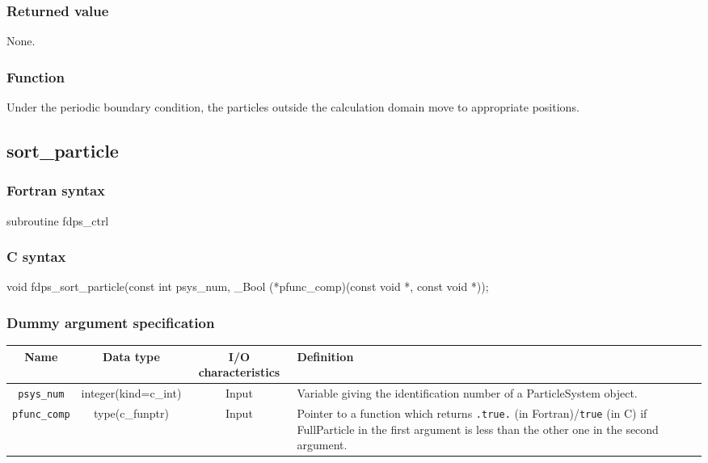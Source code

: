 \subsubsection*{Returned value}
None.

\subsubsection*{Function}
Under the periodic boundary condition, the particles outside the calculation domain move to appropriate positions.

\clearpage

\subsection{sort\_particle}
\subsubsection*{Fortran syntax}
\begin{screen}
\begin{spverbatim}
subroutine fdps_ctrl%
\end{spverbatim}
\end{screen}

\subsubsection*{C syntax}
\begin{screen}
\begin{spverbatim}
void fdps_sort_particle(const int psys_num,
                        _Bool (*pfunc_comp)(const void *, const void *));
\end{spverbatim}
\end{screen}

\subsubsection*{Dummy argument specification}
\begin{table}[h]
\begin{tabularx}{\linewidth}{cccX}
\toprule
\rowcolor{Snow2}
Name & Data type & I/O characteristics & Definition \\
\midrule
\texttt{psys\_num} & integer(kind=c\_int) & Input & Variable giving the identification number of a ParticleSystem object.\\
\texttt{pfunc\_comp} & type(c\_funptr) & Input & Pointer to a function which returns \texttt{.true.} {\small (in Fortran)}/\texttt{true} {\small (in C)} if FullParticle in the first argument is less than the other one in the second argument. \\
\bottomrule
\end{tabularx}
\end{table}

